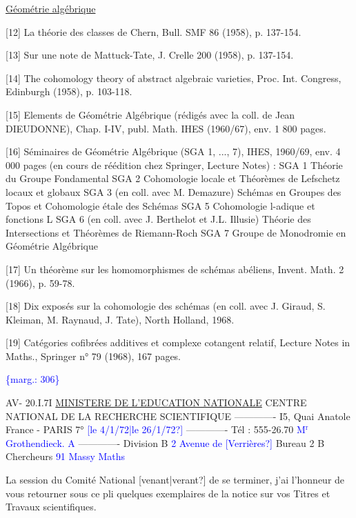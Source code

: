 \documentclass[11pt]{article}
\newcommand{\scanpage}[1]{\par\bigskip\noindent{\small\sffamily[scan #1]}\par}
\newcommand{\hand}[1]{\textcolor{blue}{#1}}
\newcommand{\margin}[1]{\textcolor{blue}{\{\textsf{marg.:} #1\}}}
\newcommand{\uline}[1]{\underline{#1}}
\newcommand{\unsure}[1]{[#1?]}
\begin{document}
\uline{Géométrie algébrique}

[12] La théorie des classes de Chern, Bull. SMF 86
(1958), p. 137-154.

[13] Sur une note de Mattuck-Tate, J. Crelle 200
(1958), p. 137-154.

[14] The cohomology theory of abstract algebraic
varieties, Proc. Int. Congress, Edinburgh
(1958), p. 103-118.

[15] Elements de Géométrie Algébrique (rédigés avec
la coll. de Jean DIEUDONNE), Chap. I-IV, publ.
Math. IHES (1960/67), env. 1 800 pages.

[16] Séminaires de Géométrie Algébrique (SGA 1, ...,
7), IHES, 1960/69, env. 4 000 pages (en cours
de réédition chez Springer, Lecture Notes) :
SGA 1 Théorie du Groupe Fondamental
SGA 2 Cohomologie locale et Théorèmes de Lefschetz
locaux et globaux
SGA 3 (en coll. avec M. Demazure) Schémas en Groupes
des Topos et Cohomologie étale des Schémas
SGA 5 Cohomologie l-adique et fonctions L
SGA 6 (en coll. avec J. Berthelot et J.L. Illusie)
Théorie des Intersections et Théorèmes de
Riemann-Roch
SGA 7 Groupe de Monodromie en Géométrie Algébrique

[17] Un théorème sur les homomorphismes de schémas
abéliens, Invent. Math. 2 (1966), p. 59-78.

[18] Dix exposés sur la cohomologie des schémas
(en coll. avec J. Giraud, S. Kleiman,
M. Raynaud, J. Tate), North Holland, 1968.

[19] Catégories cofibrées additives et complexe
cotangent relatif, Lecture Notes in Maths.,
Springer n° 79 (1968), 167 pages.

\margin{306}

\clearpage
\scanpage{119/308}
AV- 20.I.7I
\uline{MINISTERE DE L'EDUCATION NATIONALE}
CENTRE NATIONAL DE LA RECHERCHE
SCIENTIFIQUE
-------------
I5, Quai Anatole France - PARIS 7° \hand{\unsure{le 4/1/72|le 26/1/72}}
-------------
Tél : 555-26.70 \hand{M$^{\text{r}}$ Grothendieck. A}
-------------
Division B \hand{2 Avenue de \unsure{Verrières}}
Bureau 2 B
Chercheurs \hand{91 Massy}
\hand{Maths}

La session du Comité National \unsure{venant|verant} de
se terminer, j'ai l'honneur de vous retourner
sous ce pli quelques exemplaires de la notice
sur vos Titres et Travaux scientifiques.
\end{document}
